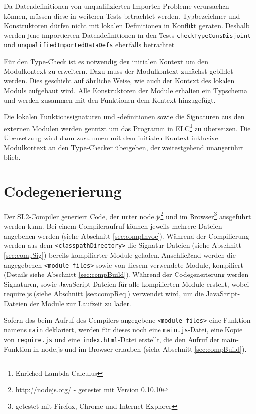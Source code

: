 \documentclass[runningheads]{llncs}
\begin{document}
Da Datendefinitionen von unqualifizierten Importen Probleme verursachen können, müssen diese in weiteren Tests betrachtet werden. Typbezeichner und Konstruktoren dürfen nicht mit lokalen Definitionen in Konflikt geraten. Deshalb werden jene importierten Datendefinitionen in den Tests \verb|checkTypeConsDisjoint| und \verb|unqualifiedImportedDataDefs| ebenfalls betrachtet

Für den Type-Check ist es notwendig den initialen Kontext um den Modulkontext zu erweitern. Dazu muss der Modulkontext zunächst gebildet werden. Dies geschieht auf ähnliche Weise, wie auch der Kontext des lokalen Moduls aufgebaut wird. Alle Konstruktoren der Module erhalten ein Typschema und werden zusammen mit den Funktionen dem Kontext hinzugefügt.

Die lokalen Funktionssignaturen und -definitionen sowie die Signaturen aus den externen Modulen werden genutzt um das Programm in ELC\footnote{Enriched Lambda Calculus} zu übersetzen. Die Übersetzung wird dann zusammen mit dem initialen Kontext inklusive Modulkontext an den Type-Checker übergeben, der weitestgehend unangerührt blieb.

\section{Codegenerierung}
\label{sec:codegen}

Der SL2-Compiler generiert Code, der unter node.js\footnote{http://nodejs.org/ - getestet mit Version 0.10.10} und im Browser\footnote{getestet mit Firefox, Chrome und Internet Explorer} ausgeführt werden kann. Bei einem Compileraufruf können jeweils mehrere
Dateien angebenen werden (siehe Abschnitt \ref{sec:compInvoc}). Während
der Compilierung werden aus dem \texttt{<classpathDirectory>} die
Signatur-Dateien (siehe Abschnitt \ref{sec:compSig}) bereits
kompilierter Module geladen. Anschließend werden die angegebenen
\texttt{<module files>} sowie von diesem verwendete Module, kompiliert
(Details siehe Abschnitt \ref{sec:compBuild}). Während der Codegenerierung
werden Signaturen, sowie JavaScript-Dateien für alle
kompilierten Module erstellt, wobei require.js (siehe Abschnitt
\ref{sec:compReq}) verwendet wird, um die JavaScript-Dateien der
Module zur Laufzeit zu laden.

Sofern das beim Aufruf des Compilers angegebene
\texttt{<module files>} eine Funktion namens
\texttt{main} deklariert, werden für dieses noch eine
\texttt{main.js}-Datei, eine Kopie von \texttt{require.js} und eine
\texttt{index.html}-Datei erstellt,
die den Aufruf der main-Funktion in node.js und im Browser erlauben
(siehe Abschnitt \ref{sec:compBuild}).
\end{document}
